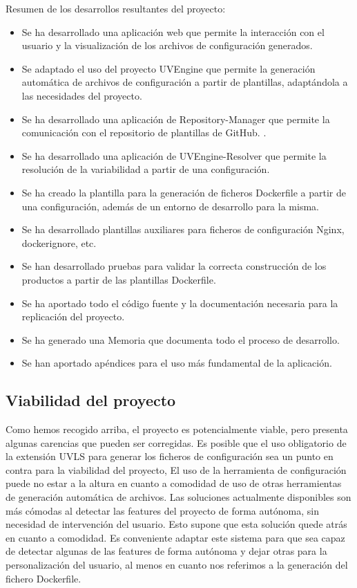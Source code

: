\documentclass[12pt, a4paper, twoside]{article}
\begin{document}
\newpage 

Resumen de los desarrollos resultantes del proyecto:
\begin{itemize}
	\item Se ha desarrollado una aplicación web que permite la interacción con el usuario y la visualización de los archivos de configuración generados.
	\item Se adaptado el uso del proyecto UVEngine que permite la generación automática de archivos de configuración a partir de plantillas, adaptándola a las necesidades del proyecto.
	\item Se ha desarrollado una aplicación de Repository-Manager que permite la comunicación con el repositorio de plantillas de GitHub. \cite{m4rdom_templates} .
	\item Se ha desarrollado una aplicación de UVEngine-Resolver que permite la resolución de la variabilidad a partir de una configuración.
	\item Se ha creado la plantilla para la generación de ficheros Dockerfile a partir de una configuración, además de un entorno de desarrollo para la misma.
	\item Se ha desarrollado plantillas auxiliares para ficheros de configuración Nginx, dockerignore, etc.
	\item Se han desarrollado pruebas para validar la correcta construcción de los productos a partir de las plantillas Dockerfile.
	\item Se ha aportado todo el código fuente y la documentación necesaria para la replicación del proyecto.
	\item Se ha generado una Memoria que documenta todo el proceso de desarrollo.
	\item Se han aportado apéndices para el uso más fundamental de la aplicación.
\end{itemize}

\subsection{Viabilidad del proyecto}
Como hemos recogido arriba, el proyecto es potencialmente viable, pero presenta algunas carencias que pueden ser corregidas.
Es posible que el uso obligatorio de la extensión UVLS para generar los ficheros de configuración sea un punto en contra para la viabilidad del proyecto, 
El uso de la herramienta de configuración puede no estar a la altura en cuanto a comodidad de uso de otras herramientas de generación automática de archivos.
Las soluciones actualmente disponibles son más cómodas al detectar las features del proyecto de forma autónoma, sin necesidad de intervención del usuario. Esto supone que esta solución quede atrás en cuanto a comodidad. 
Es conveniente adaptar este sistema para que sea capaz de detectar algunas de las features de forma autónoma y dejar otras para la personalización del usuario, al menos en cuanto nos referimos a la generación del fichero Dockerfile.
\end{document}
